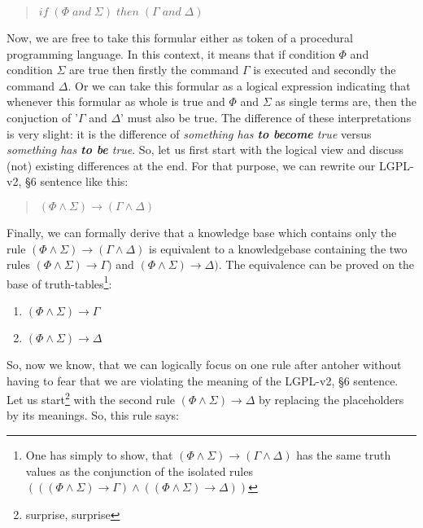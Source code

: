 \begin{quote}\noindent $if \; (\Phi \; and \; \Sigma) \; then \;
(\Gamma \; and \; \Delta)$
\end{quote}

Now, we are free to take this formular either as token of a procedural
programming language. In this context, it means that if condition $\Phi$ and
condition $\Sigma$ are true then firstly the command $\Gamma$ is executed and
secondly the command $\Delta$. Or we can take this formular as a logical
expression indicating that whenever this formular as whole is true and $\Phi$
and $\Sigma$ as single terms are, then the conjuction of '$\Gamma$ and $\Delta$'
must also be true. The difference of these interpretations is very slight: it is
the difference of \emph{something has \textbf{to become} true} versus
\emph{something has \textbf{to be} true}. So, let us first start with the
logical view and discuss (not) existing differences at the end. For that
purpose, we can rewrite our LGPL-v2, §6 sentence like this:

\begin{quote}\noindent
$(\Phi \wedge \Sigma) \rightarrow (\Gamma \wedge \Delta)$
\end{quote}

Finally, we can formally derive that a knowledge base which contains only the
rule $(\Phi \wedge \Sigma) \rightarrow (\Gamma \wedge \Delta)$ is equivalent to
a knowledgebase containing the two rules $(\Phi \wedge \Sigma) \rightarrow
\Gamma)$ and $(\Phi \wedge \Sigma) \rightarrow \Delta)$. The equivalence can be
proved on the base of truth-tables\footnote{One has simply to show, that $(\Phi
\wedge \Sigma) \rightarrow (\Gamma \wedge \Delta)$ has the same truth values as
the conjunction of the isolated rules $(((\Phi \wedge \Sigma) \rightarrow
\Gamma) \wedge ((\Phi \wedge \Sigma) \rightarrow \Delta))$

 }:

\begin{enumerate}
\item $(\Phi \wedge \Sigma) \rightarrow \Gamma$
\item $(\Phi \wedge \Sigma) \rightarrow \Delta$
\end{enumerate}

So, now we know, that we can logically focus on one rule after antoher without
having to fear that we are violating the meaning of the LGPL-v2, §6 sentence.
Let us start\footnote{surprise, surprise} with the second rule $(\Phi
\wedge \Sigma) \rightarrow \Delta$ by replacing the placeholders by its
meanings. So, this rule says:

